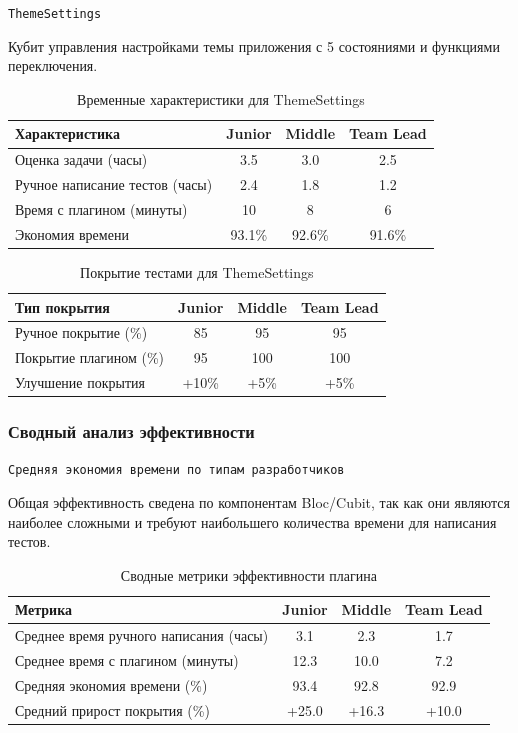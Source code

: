 \documentclass[14pt, russian]{scrartcl}
\begin{document}
\texttt{ThemeSettings}

Кубит управления настройками темы приложения с 5 состояниями и функциями переключения.

\begin{table}[h!]
\centering
\begin{tabular}{|l|c|c|c|}
\hline
Характеристика & Junior & Middle & Team Lead \\
\hline
Оценка задачи (часы) & 3.5 & 3.0 & 2.5 \\
Ручное написание тестов (часы) & 2.4 & 1.8 & 1.2 \\
Время с плагином (минуты) & 10 & 8 & 6 \\
Экономия времени & 93.1\% & 92.6\% & 91.6\% \\
\hline
\end{tabular}
\vspace{1ex}
\caption{Временные характеристики для ThemeSettings}
\end{table}

\begin{table}[h!]
\centering
\begin{tabular}{|l|c|c|c|}
\hline
Тип покрытия & Junior & Middle & Team Lead \\
\hline
Ручное покрытие (\%) & 85 & 95 & 95 \\
Покрытие плагином (\%) & 95 & 100 & 100 \\
Улучшение покрытия & +10\% & +5\% & +5\% \\
\hline
\end{tabular}
\vspace{1ex}
\caption{Покрытие тестами для ThemeSettings}
\end{table}

\subsubsection{Сводный анализ эффективности}

\texttt{Средняя экономия времени по типам разработчиков}

Общая эффективность сведена по компонентам Bloc/Cubit, так как они являются наиболее сложными и требуют наибольшего количества времени для написания тестов.

\begin{table}[h!]
\centering
\begin{tabular}{|l|c|c|c|}
\hline
Метрика & Junior & Middle & Team Lead \\
\hline
Среднее время ручного написания (часы) & 3.1 & 2.3 & 1.7 \\
Среднее время с плагином (минуты) & 12.3 & 10.0 & 7.2 \\
Средняя экономия времени (\%) & 93.4 & 92.8 & 92.9 \\
Средний прирост покрытия (\%) & +25.0 & +16.3 & +10.0 \\
\hline
\end{tabular}
\vspace{1ex}
\caption{Сводные метрики эффективности плагина}
\end{table}
\end{document}
